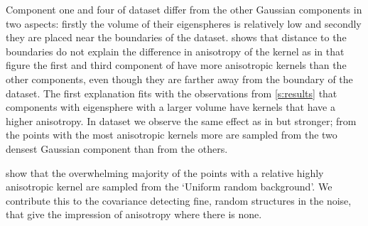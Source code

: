 			Component one and four of dataset \ferdosiThree differ from the other Gaussian components in two aspects: firstly the volume of their eigenspheres is relatively low and secondly they are placed near the boundaries of the dataset. 
				 shows that distance to the boundaries do not explain the difference in anisotropy of the kernel as in that figure the first and third component of \ferdosiThreeNoise have more anisotropic kernels than the other components, even though they are farther away from the boundary of the dataset.
				The first explanation fits with the observations from \cref{s:results} that components with eigensphere with a larger volume have kernels that have a higher anisotropy.
			In dataset \baakmanThree we observe the same effect as in \ferdosiThree but stronger; from the points with the most anisotropic kernels more are sampled from the two densest Gaussian component than from the others. 

	 show that the overwhelming majority of the points with a relative highly anisotropic kernel are sampled from the `Uniform random background'. We contribute this to the covariance detecting fine, random structures in the noise, that give the impression of anisotropy where there is none.

